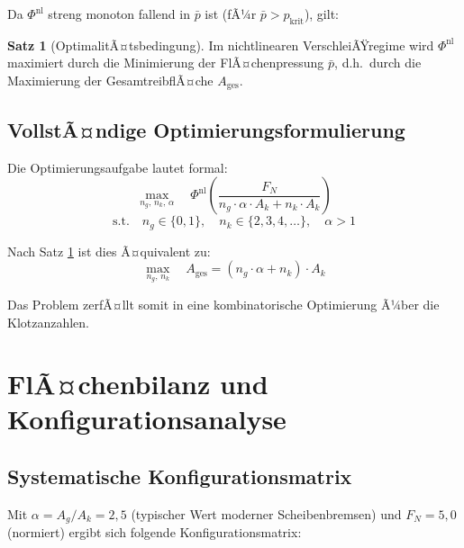 ﻿\documentclass[12pt,a4paper]{article}
\theoremstyle{definition}
\newtheorem{satz}{Satz}[section]
\begin{document}
Da $\Phi^{\text{nl}}$ streng monoton fallend in $\bar{p}$ ist
(fÃ¼r $\bar{p} > p_{\text{krit}}$), gilt:

\begin{satz}[OptimalitÃ¤tsbedingung]
  Im nichtlinearen VerschleiÃŸregime wird $\Phi^{\text{nl}}$ maximiert
  durch die Minimierung der FlÃ¤chenpressung $\bar{p}$, d.h.\ durch die
  Maximierung der GesamtreibflÃ¤che $A_{\text{ges}}$.
  \label{satz:optimum}
\end{satz}

\subsection{VollstÃ¤ndige Optimierungsformulierung}

Die Optimierungsaufgabe lautet formal:
\begin{equation}
  \max_{n_g,\,n_k,\,\alpha} \quad
  \Phi^{\text{nl}}\!\left(\frac{F_N}{n_g \cdot \alpha \cdot A_k + n_k \cdot A_k}\right)
  \label{eq:opt_problem}
\end{equation}
\begin{equation*}
  \text{s.t.} \quad n_g \in \{0, 1\}, \quad n_k \in \{2, 3, 4, \ldots\}, \quad \alpha > 1
\end{equation*}

Nach Satz \ref{satz:optimum} ist dies Ã¤quivalent zu:
\begin{equation}
  \max_{n_g,\,n_k} \quad A_{\text{ges}} = (n_g \cdot \alpha + n_k) \cdot A_k
  \label{eq:opt_aequivalent}
\end{equation}

Das Problem zerfÃ¤llt somit in eine kombinatorische Optimierung Ã¼ber die
Klotzanzahlen.

\section{FlÃ¤chenbilanz und Konfigurationsanalyse}

\subsection{Systematische Konfigurationsmatrix}

Mit $\alpha = A_g / A_k = 2{,}5$ (typischer Wert moderner Scheibenbremsen)
und $F_N = 5{,}0$ (normiert) ergibt sich folgende Konfigurationsmatrix:
\end{document}
